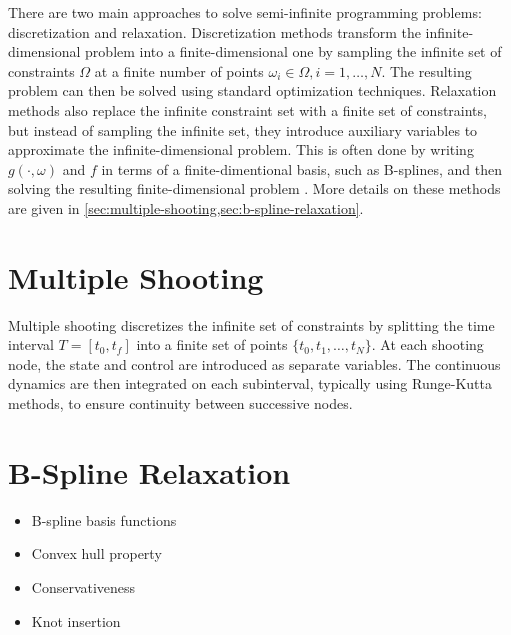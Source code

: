 There are two main approaches to solve semi-infinite programming problems: discretization and relaxation. Discretization methods transform the infinite-dimensional problem into a finite-dimensional one by sampling the infinite set of constraints $\Omega$ at a finite number of points $\omega_i \in \Omega, i = 1, \ldots, N$. The resulting problem can then be solved using standard optimization techniques. Relaxation methods also replace the infinite constraint set with a finite set of constraints, but instead of sampling the infinite set, they introduce auxiliary variables to approximate the infinite-dimensional problem. This is often done by writing $g(\cdot, \omega)$ and $f$ in terms of a finite-dimentional basis, such as B-splines, and then solving the resulting finite-dimensional problem \citep{Dierckx1993}. More details on these methods are given in \cref{sec:multiple-shooting,sec:b-spline-relaxation}.

\section{Multiple Shooting}\label{sec:multiple-shooting}
Multiple shooting discretizes the infinite set of constraints by splitting the time interval $T = [t_0,t_f]$ into a finite set of points $\{t_0, t_1, \ldots, t_N\}$. At each shooting node, the state and control are introduced as separate variables. The continuous dynamics are then integrated on each subinterval, typically using Runge-Kutta methods, to ensure continuity between successive nodes.
 
\section{B-Spline Relaxation}\label{sec:b-spline-relaxation}
\begin{itemize}
    \item B-spline basis functions
    \item Convex hull property
    \item Conservativeness
    \item Knot insertion
\end{itemize}
